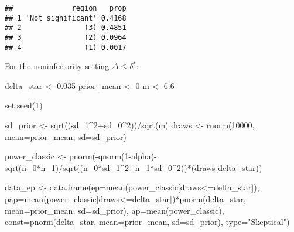 \documentclass[
]{book}
\newenvironment{Shaded}{\begin{snugshade}}{\end{snugshade}}
\newcommand{\AttributeTok}[1]{\textcolor[rgb]{0.77,0.63,0.00}{#1}}
\newcommand{\DecValTok}[1]{\textcolor[rgb]{0.00,0.00,0.81}{#1}}
\newcommand{\FloatTok}[1]{\textcolor[rgb]{0.00,0.00,0.81}{#1}}
\newcommand{\FunctionTok}[1]{\textcolor[rgb]{0.00,0.00,0.00}{#1}}
\newcommand{\NormalTok}[1]{#1}
\newcommand{\OtherTok}[1]{\textcolor[rgb]{0.56,0.35,0.01}{#1}}
\newcommand{\SpecialCharTok}[1]{\textcolor[rgb]{0.00,0.00,0.00}{#1}}
\newcommand{\StringTok}[1]{\textcolor[rgb]{0.31,0.60,0.02}{#1}}
\begin{document}
\begin{verbatim}
##              region   prop
## 1 'Not significant' 0.4168
## 2               (3) 0.4851
## 3               (2) 0.0964
## 4               (1) 0.0017
\end{verbatim}

For the noninferiority setting \(\Delta\leq\delta^*\):

\begin{Shaded}
\begin{Highlighting}[]
\NormalTok{delta\_star }\OtherTok{\textless{}{-}} \FloatTok{0.035}
\NormalTok{prior\_mean }\OtherTok{\textless{}{-}} \DecValTok{0}
\NormalTok{m }\OtherTok{\textless{}{-}} \FloatTok{6.6}

\FunctionTok{set.seed}\NormalTok{(}\DecValTok{1}\NormalTok{)}

\NormalTok{sd\_prior }\OtherTok{\textless{}{-}} \FunctionTok{sqrt}\NormalTok{((sd\_1}\SpecialCharTok{\^{}}\DecValTok{2}\SpecialCharTok{+}\NormalTok{sd\_0}\SpecialCharTok{\^{}}\DecValTok{2}\NormalTok{))}\SpecialCharTok{/}\FunctionTok{sqrt}\NormalTok{(m)}
\NormalTok{draws }\OtherTok{\textless{}{-}} \FunctionTok{rnorm}\NormalTok{(}\DecValTok{10000}\NormalTok{, }\AttributeTok{mean=}\NormalTok{prior\_mean, }\AttributeTok{sd=}\NormalTok{sd\_prior)}

\NormalTok{power\_classic }\OtherTok{\textless{}{-}} \FunctionTok{pnorm}\NormalTok{(}\SpecialCharTok{{-}}\FunctionTok{qnorm}\NormalTok{(}\DecValTok{1}\SpecialCharTok{{-}}\NormalTok{alpha)}\SpecialCharTok{{-}}\FunctionTok{sqrt}\NormalTok{(n\_0}\SpecialCharTok{*}\NormalTok{n\_1)}\SpecialCharTok{/}\FunctionTok{sqrt}\NormalTok{((n\_0}\SpecialCharTok{*}\NormalTok{sd\_1}\SpecialCharTok{\^{}}\DecValTok{2}\SpecialCharTok{+}\NormalTok{n\_1}\SpecialCharTok{*}\NormalTok{sd\_0}\SpecialCharTok{\^{}}\DecValTok{2}\NormalTok{))}\SpecialCharTok{*}\NormalTok{(draws}\SpecialCharTok{{-}}\NormalTok{delta\_star))}

\NormalTok{data\_ep }\OtherTok{\textless{}{-}} \FunctionTok{data.frame}\NormalTok{(}\AttributeTok{ep=}\FunctionTok{mean}\NormalTok{(power\_classic[draws}\SpecialCharTok{\textless{}=}\NormalTok{delta\_star]), }\AttributeTok{pap=}\FunctionTok{mean}\NormalTok{(power\_classic[draws}\SpecialCharTok{\textless{}=}\NormalTok{delta\_star])}\SpecialCharTok{*}\FunctionTok{pnorm}\NormalTok{(delta\_star, }\AttributeTok{mean=}\NormalTok{prior\_mean, }\AttributeTok{sd=}\NormalTok{sd\_prior), }\AttributeTok{ap=}\FunctionTok{mean}\NormalTok{(power\_classic), }\AttributeTok{const=}\FunctionTok{pnorm}\NormalTok{(delta\_star, }\AttributeTok{mean=}\NormalTok{prior\_mean, }\AttributeTok{sd=}\NormalTok{sd\_prior), }\AttributeTok{type=}\StringTok{"Skeptical"}\NormalTok{)}


\end{Highlighting}
\end{Shaded}
\end{document}
